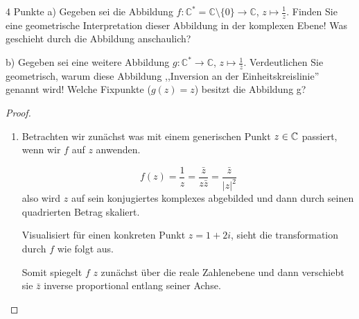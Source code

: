 \documentclass{../problemset}
\begin{document}
\begin{problem}[Einheitskreis]{4 Punkte}
a) Gegeben sei die Abbildung $f : \mathbb{C}^* = \mathbb{C} \setminus \{0\} \rightarrow \mathbb{C}$, $z \mapsto \frac{1}{z}$. Finden Sie eine geometrische Interpretation dieser Abbildung in der komplexen Ebene! Was geschieht durch die Abbildung anschaulich?

b) Gegeben sei eine weitere Abbildung $g : \mathbb{C}^* \rightarrow
	\mathbb{C}$, $z \mapsto \frac{1}{\overline{z}}$. Verdeutlichen Sie geometrisch,
warum diese Abbildung ,,Inversion an der Einheitskreislinie'' genannt wird!
Welche Fixpunkte ($g(z) = z$) besitzt die Abbildung g?

\begin{proof}
	\leavevmode
	\begin{enumerate}
		\item Betrachten wir zunächst was mit einem generischen Punkt $z \in \mathbb{C}$
		      passiert, wenn wir $f$ auf $z$ anwenden.

		      \[
			      f(z) = \frac{1}{z} = \frac{\bar{z}}{z \bar{z}} = \frac{\bar{z}}{{|z|}^2}
		      \] also wird $z$ auf sein konjugiertes komplexes abgebilded und dann durch seinen
		      quadrierten Betrag skaliert.

		      Visualisiert für einen konkreten Punkt $z = 1 + 2i$, sieht die transformation
		      durch $f$ wie folgt aus.

		      \begin{center}
		      \end{center}

		      Somit spiegelt $f$ $z$ zunächst über die reale Zahlenebene und dann verschiebt
		      sie $\bar{z}$ inverse proportional entlang seiner Achse.


\end{enumerate}
\end{proof}
\end{problem}
\end{document}
